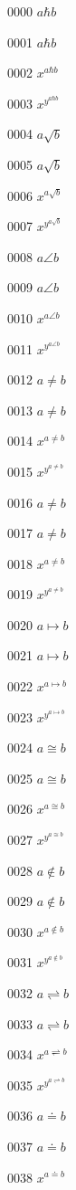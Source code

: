 \documentclass{article}
\begin{document}
0000 $a\hbar b$\par
0001 $\displaystyle a\hbar b$\par
0002 $x^{a\hbar b}$\par
0003 $x^{y^{a\hbar b}}$\par
0004 $a\surd b$\par
0005 $\displaystyle a\surd b$\par
0006 $x^{a\surd b}$\par
0007 $x^{y^{a\surd b}}$\par
0008 $a\angle b$\par
0009 $\displaystyle a\angle b$\par
0010 $x^{a\angle b}$\par
0011 $x^{y^{a\angle b}}$\par
0012 $a\neq b$\par
0013 $\displaystyle a\neq b$\par
0014 $x^{a\neq b}$\par
0015 $x^{y^{a\neq b}}$\par
0016 $a\ne b$\par
0017 $\displaystyle a\ne b$\par
0018 $x^{a\ne b}$\par
0019 $x^{y^{a\ne b}}$\par
0020 $a\mapsto b$\par
0021 $\displaystyle a\mapsto b$\par
0022 $x^{a\mapsto b}$\par
0023 $x^{y^{a\mapsto b}}$\par
0024 $a\cong b$\par
0025 $\displaystyle a\cong b$\par
0026 $x^{a\cong b}$\par
0027 $x^{y^{a\cong b}}$\par
0028 $a\notin b$\par
0029 $\displaystyle a\notin b$\par
0030 $x^{a\notin b}$\par
0031 $x^{y^{a\notin b}}$\par
0032 $a\rightleftharpoons b$\par
0033 $\displaystyle a\rightleftharpoons b$\par
0034 $x^{a\rightleftharpoons b}$\par
0035 $x^{y^{a\rightleftharpoons b}}$\par
0036 $a\doteq b$\par
0037 $\displaystyle a\doteq b$\par
0038 $x^{a\doteq b}$\par
\end{document}
